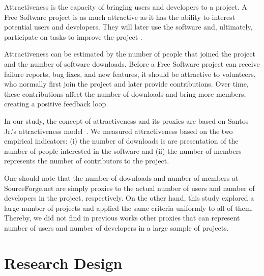 \documentclass[conference]{IEEEtran}
\begin{document}
Attractiveness is the capacity of bringing users and developers to a project.
%
A Free Software project is as much attractive as it has the ability to interest 
potential users and developers. They will later use the software and, ultimately, 
participate on tasks to improve the project \cite{Santos2010}.

Attractiveness can be estimated by the number of people that
joined the project and the number of software downloads.
%
Before a Free Software project can receive failure reports, bug fixes, 
and new features, it should be attractive to volunteers, who normally first join the project 
and later provide contributions.
%
Over time, these contributions affect the number of downloads and bring more 
members, creating a positive feedback loop.

In our study, the concept of attractiveness and its proxies are
based on Santos Jr.'s attractiveness model~\cite{Santos2010}.
We measured attractiveness based on the two empirical indicators: 
(i) the number of downloads is are presentation of the number of people interested
in the software and (ii) the number of members represents the number of 
contributors to the project.

One should note that the number of downloads and number of members
at SourceForge.net are simply proxies to the actual number of users and number of
developers in the project, respectively.
%
On the other hand, this study explored a large number of projects and applied 
the same criteria uniformly to all of them. 
%
Thereby, we did not find in previous works other proxies that can represent 
number of users and number of developers in a large sample of projects.



%


\section{Research Design} 
\label{researchDesign}
\end{document}
